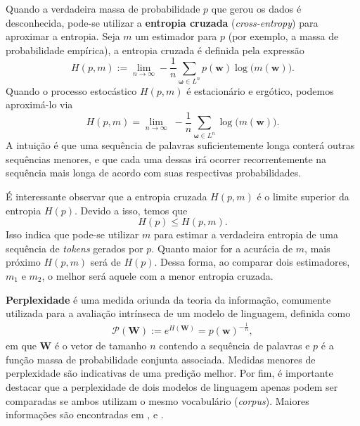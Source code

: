 \documentclass[twoside]{automatextcc}
\newcommand{\Perp}{\mathcal{P}}
\newcommand{\bs}[1]{\boldsymbol{#1}}
\begin{document}
Quando a verdadeira massa de probabilidade $p$ que gerou os dados é desconhecida, pode-se utilizar a \textbf{entropia cruzada} (\textit{cross-entropy}) para aproximar a entropia. Seja $m$ um estimador para $p$ (por exemplo, a massa de probabilidade empírica), a entropia cruzada é definida pela expressão
\begin{equation*}
    H(p,m) := \lim_{n \rightarrow \infty}  - \frac{1}{n} \sum_{\bs\omega \in L^n}  p(\bs{w}) \log\big(m(\bs{w})\big) .
\end{equation*}
Quando o processo estocástico $H(p,m)$ é estacionário e ergótico, podemos aproximá-lo via
\begin{equation*}
    H(p,m) = \lim_{n \rightarrow \infty} \; - \frac{1}{n} \sum_{\bs\omega \in L^n} \log\big(m(\bs{w})\big).
\end{equation*}
A intuição é que uma sequência de palavras suficientemente longa conterá outras sequências menores, e que cada uma dessas irá ocorrer recorrentemente na sequência mais longa de acordo com suas respectivas probabilidades.

É interessante observar que a entropia cruzada $H(p,m)$ é o limite superior da entropia $H(p)$. Devido a isso, temos que
\begin{equation*}
    H(p) \leq H(p,m).
\end{equation*}
Isso indica que pode-se utilizar $m$ para estimar a verdadeira entropia de uma sequência de \textit{tokens} gerados por $p$. Quanto maior for a acurácia de $m$, mais próximo $H(p,m)$ será de $H(p)$. Dessa forma, ao comparar dois estimadores, $m_1$ e $m_2$, o melhor será aquele com a menor entropia cruzada.

\textbf{Perplexidade} é uma medida oriunda da teoria da informação, comumente utilizada para a avaliação intrínseca de um modelo de linguagem, definida como
\begin{align*}
    \Perp (\bs{W}) := e^{H(\bs{W})} = p(\bs{w})^{-\frac{1}{n}},
\end{align*}
em que $\bs{W}$ é o vetor de tamanho $n$ contendo a sequência de palavras e $p$ é a função massa de probabilidade conjunta associada. 
Medidas menores de perplexidade são indicativas de uma predição melhor. Por fim, é importante destacar que a perplexidade de dois modelos de linguagem apenas podem ser comparadas se ambos utilizam o mesmo vocabulário (\textit{corpus}). Maiores informações são encontradas em \citet{manning1999}, \citet{kamath2019} e \citet{jurafsky2021}.
\end{document}
